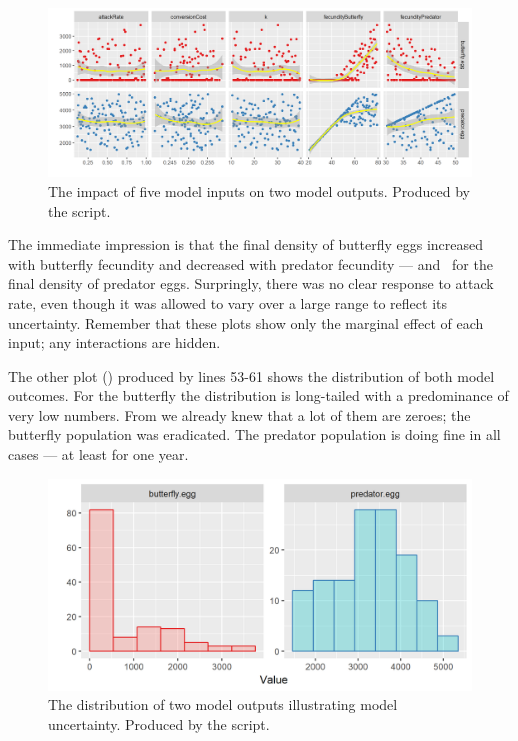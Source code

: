 \begin{figure} 
\centering
\includegraphics[width=\textwidth]{graphics/uncertainty-analysis-pred-prey-1}
\caption{The impact of five model inputs on two model outputs. Produced by the  script.}
\label{fig:uncertainty-analysis-pred-prey-1}
\end{figure}

The immediate impression is that the final density of butterfly eggs increased with butterfly fecundity and decreased with predator fecundity --- and \viceversa\ for the final density of predator eggs. Surpringly, there was no clear response to attack rate, even though it was allowed to vary over a large range to reflect its uncertainty. Remember that these plots show only the marginal effect of each input; any interactions are hidden.

The other plot () produced by lines 53-61 shows the  distribution of both model outcomes. For the butterfly the distribution is long-tailed with a predominance of very low numbers. From  we already knew that a lot of them are zeroes; the butterfly population was eradicated. The predator population is doing fine in all cases --- at least for one year.

\begin{figure} 
\centering
\includegraphics[width=\textwidth]{graphics/uncertainty-analysis-pred-prey-2}
\caption{The distribution of two model outputs illustrating model uncertainty. Produced by the  script.}
\label{fig:uncertainty-analysis-pred-prey-2}
\end{figure}

